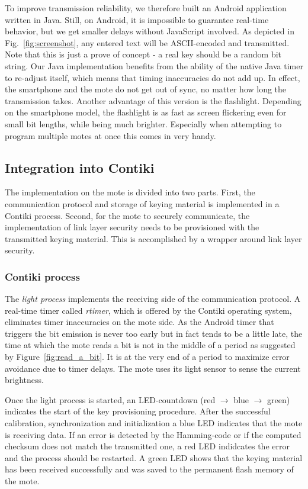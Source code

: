 \documentclass{sig-alternate} %
\begin{document}
To improve transmission reliability, we therefore built an Android application written in Java.
Still, on Android, it is impossible to guarantee real-time behavior, but we get smaller delays without JavaScript involved.
As depicted in Fig.~\ref{fig:screenshot}, any entered text will be ASCII-encoded and transmitted.
Note that this is just a prove of concept - a real key should be a random bit string.
Our Java implementation benefits from the ability of the native Java timer to re-adjust itself, which means that timing inaccuracies do not add up.
In effect, the smartphone and the mote do not get out of sync, no matter how long the transmission takes.
Another advantage of this version is the flashlight.
Depending on the smartphone model, the flashlight is as fast as screen flickering even for small bit lengths, while being much brighter.
Especially when attempting to program multiple motes at once this comes in very handy.


\subsection{Integration into Contiki}
\label{sub:mote}

The implementation on the mote is divided into two parts.
First, the communication protocol and storage of keying material is implemented in a Contiki process.
Second, for the mote to securely communicate, the implementation of link layer security needs to be provisioned with the transmitted keying material.
This is accomplished by a wrapper around link layer security.

\subsubsection{Contiki process}
\label{ssub:contiki_process}

The \textit{light process} implements the receiving side of the communication protocol.
A real-time timer called \textit{rtimer}, which is offered by the Contiki operating system, eliminates timer inaccuracies on the mote side.
As the Android timer that triggers the bit emission is never too early but in fact tends to be a little late\cite{mongia2010reliable}, the time at which the mote reads a bit is not in the middle of a period as suggested by Figure~\ref{fig:read_a_bit}.
It is at the very end of a period to maximize error avoidance due to timer delays.
The mote uses its light sensor to sense the current brightness.

Once the light process is started, an LED-countdown (red $\rightarrow$ blue $\rightarrow$ green) indicates the start of the key provisioning procedure.
After the successful calibration, synchronization and initialization a blue LED indicates that the mote is receiving data.
If an error is detected by the Hamming-code or if the computed checksum does not match the transmitted one, a red LED indidcates the error and the process should be restarted.
A green LED shows that the keying material has been received successfully and was saved to the permanent flash memory of the mote.
\end{document}
